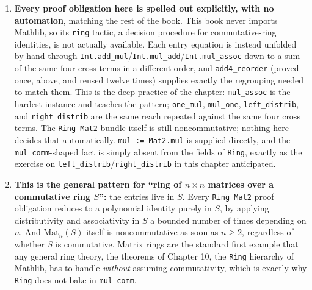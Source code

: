 \begin{enumerate}
\def\labelenumi{\arabic{enumi}.}
\tightlist
\item
  \textbf{Every proof obligation here is spelled out explicitly, with no automation}, matching the rest of the book. This book never imports Mathlib, so its \texttt{ring} tactic, a decision procedure for commutative-ring identities, is not actually available. Each entry equation is instead unfolded by hand through \texttt{Int.add\_\allowbreak{}mul}/\texttt{Int.mul\_\allowbreak{}add}/\texttt{Int.mul\_\allowbreak{}assoc} down to a sum of the same four cross terms in a different order, and \texttt{add4\_\allowbreak{}reorder} (proved once, above, and reused twelve times) supplies exactly the regrouping needed to match them. This is the deep practice of the chapter: \texttt{mul\_\allowbreak{}assoc} is the hardest instance and teaches the pattern; \texttt{one\_\allowbreak{}mul}, \texttt{mul\_\allowbreak{}one}, \texttt{left\_\allowbreak{}distrib}, and \texttt{right\_\allowbreak{}distrib} are the same reach repeated against the same four cross terms. The \texttt{Ring Mat2} bundle itself is still noncommutative; nothing here decides that automatically. \texttt{mul := Mat2.mul} is supplied directly, and the \texttt{mul\_\allowbreak{}comm}-shaped fact is simply absent from the fields of \texttt{Ring}, exactly as the exercise on \texttt{left\_\allowbreak{}distrib}/\texttt{right\_\allowbreak{}distrib} in this chapter anticipated.
\item
  \textbf{This is the general pattern for ``ring of \(n\times n\) matrices over a commutative ring \(S\)'':} the entries live in \(S\). Every \texttt{Ring Mat2} proof obligation reduces to a polynomial identity purely in \(S\), by applying distributivity and associativity in \(S\) a bounded number of times depending on \(n\). And \(\text{Mat}_n(S)\) itself is noncommutative as soon as \(n \geq 2\), regardless of whether \(S\) is commutative. Matrix rings are the standard first example that any general ring theory, the theorems of Chapter 10, the \texttt{Ring} hierarchy of Mathlib, has to handle \emph{without} assuming commutativity, which is exactly why \texttt{Ring} does not bake in \texttt{mul\_\allowbreak{}comm}.
\end{enumerate}

